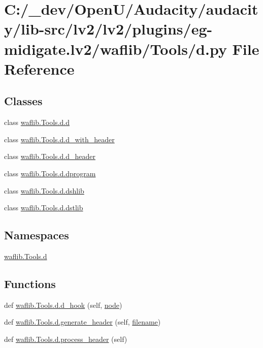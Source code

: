\hypertarget{lv2_2plugins_2eg-midigate_8lv2_2waflib_2_tools_2d_8py}{}\section{C\+:/\+\_\+dev/\+Open\+U/\+Audacity/audacity/lib-\/src/lv2/lv2/plugins/eg-\/midigate.lv2/waflib/\+Tools/d.py File Reference}
\label{lv2_2plugins_2eg-midigate_8lv2_2waflib_2_tools_2d_8py}
\subsection*{Classes}
\begin{DoxyCompactItemize}
\item 
class \hyperlink{classwaflib_1_1_tools_1_1d_1_1d}{waflib.\+Tools.\+d.\+d}
\item 
class \hyperlink{classwaflib_1_1_tools_1_1d_1_1d__with__header}{waflib.\+Tools.\+d.\+d\+\_\+with\+\_\+header}
\item 
class \hyperlink{classwaflib_1_1_tools_1_1d_1_1d__header}{waflib.\+Tools.\+d.\+d\+\_\+header}
\item 
class \hyperlink{classwaflib_1_1_tools_1_1d_1_1dprogram}{waflib.\+Tools.\+d.\+dprogram}
\item 
class \hyperlink{classwaflib_1_1_tools_1_1d_1_1dshlib}{waflib.\+Tools.\+d.\+dshlib}
\item 
class \hyperlink{classwaflib_1_1_tools_1_1d_1_1dstlib}{waflib.\+Tools.\+d.\+dstlib}
\end{DoxyCompactItemize}
\subsection*{Namespaces}
\begin{DoxyCompactItemize}
\item 
 \hyperlink{namespacewaflib_1_1_tools_1_1d}{waflib.\+Tools.\+d}
\end{DoxyCompactItemize}
\subsection*{Functions}
\begin{DoxyCompactItemize}
\item 
def \hyperlink{namespacewaflib_1_1_tools_1_1d_a0b6f5907fb19962703822b05f5d2c7f6}{waflib.\+Tools.\+d.\+d\+\_\+hook} (self, \hyperlink{structnode}{node})
\item 
def \hyperlink{namespacewaflib_1_1_tools_1_1d_abeab4cb06670217a6a35b8a77933e947}{waflib.\+Tools.\+d.\+generate\+\_\+header} (self, \hyperlink{test__portburn_8cpp_a7efa5e9c7494c7d4586359300221aa5d}{filename})
\item 
def \hyperlink{namespacewaflib_1_1_tools_1_1d_ae7724c426c7d6b03c2f1e81bf03f40a9}{waflib.\+Tools.\+d.\+process\+\_\+header} (self)
\end{DoxyCompactItemize}
